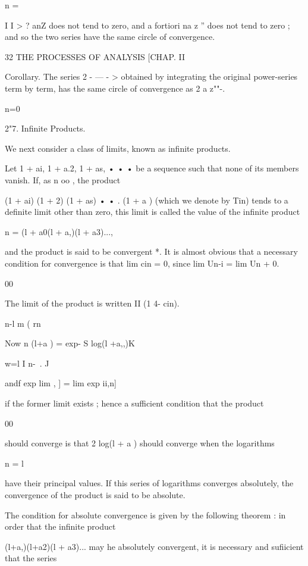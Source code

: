 n = 

I   I > ?  anZ  does not tend to zero, and a fortiori na z '' does not tend to 
zero ; and so the two series have the same circle of convergence. 



32 THE PROCESSES OF ANALYSIS [CHAP. II 

Corollary. The series 2 - — - > obtained by integrating the original power-series 
term by term, has the same circle of convergence as 2 a z""-. 

n=0 

2"7. Infinite Products. 

We next consider a class of limits, known as infinite products. 

Let 1 + ai, 1 + a.2, 1 + as, • • • be a sequence such that none of its members 
vanish. If, as n   oo , the product 

(1 + ai) (1 +  2) (1 + as) • • . (1 + a ) 
(which we denote by Tin) tends to a definite limit other than zero, this limit 
is called the value of the infinite product 

n = (l + a0(l + a,)(l + a3)..., 

and the product is said to be convergent *. It is almost obvious that a necessary 
condition for convergence is that lim cin = 0, since lim Un-i = lim Un + 0. 

00 

The limit of the product is written II (1 4- cin). 

n-l 
m ( rn \ 

Now n (l+a ) = exp-  S log(l +a,,)K 

w=l I n-\ . J 

andf exp   lim  , ] = lim  exp ii,n] 

if the former limit exists ; hence a sufficient condition that the product 

00 

should converge is that 2 log(l + a ) should converge when the logarithms 

n = l 

have their principal values. If this series of logarithms converges absolutely, 
the convergence of the product is said to be absolute. 

The condition for absolute convergence is given by the following theorem : 
in order that the infinite product 

(l+a,)(l+a2)(l + a3)... 
may he absolutely convergent, it is necessary and sufiicient that the series 

